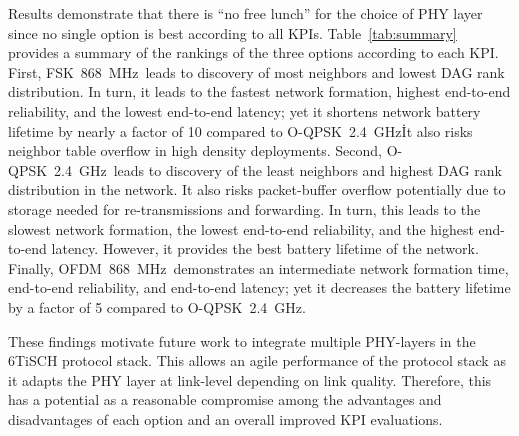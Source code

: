\documentclass[journal,article,submit,moreauthors,pdftex]{Definitions/mdpi}
\newcommand{\fsk}          {FSK~868~MHz}
\newcommand{\oqpsk}        {O-QPSK~2.4~GHz}
\newcommand{\ofdm}         {OFDM~868~MHz}
\begin{document}

Results demonstrate that there is ``no free lunch'' for the choice of PHY layer since no single option is best according to all KPIs.
Table~\ref{tab:summary} provides a summary of the rankings of the three options according to each KPI.
First, \fsk\ leads to discovery of most neighbors and lowest DAG rank distribution.
In turn, it leads to the fastest network formation, highest end-to-end reliability, and the lowest end-to-end latency; yet it shortens network battery lifetime by nearly a factor of 10 compared to \oqpsk\. 
It also risks neighbor table overflow in high density deployments.
Second, \oqpsk\ leads to discovery of the least neighbors and highest DAG rank distribution in the network.
It also risks packet-buffer overflow potentially due to storage needed for re-transmissions and forwarding.
In turn, this leads to the slowest network formation, the lowest end-to-end reliability, and the highest end-to-end latency.
However, it provides the best battery lifetime of the network. 
Finally, \ofdm\ demonstrates an intermediate network formation time, end-to-end reliability, and end-to-end latency; yet  it decreases the battery lifetime by a factor of 5 compared to \oqpsk.


These findings motivate future work to integrate multiple PHY-layers in the 6TiSCH protocol stack.
This allows an agile performance of the protocol stack as it adapts the PHY layer at link-level depending on link quality.
Therefore, this has a potential as a reasonable compromise among the advantages and disadvantages of each option and an overall improved KPI evaluations. 

% 

\end{document}
